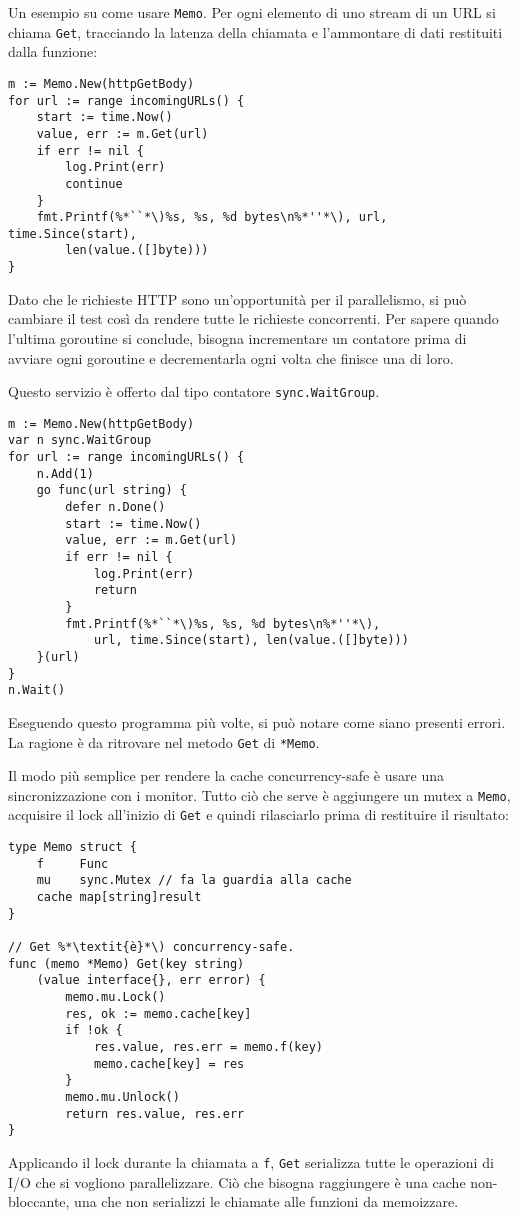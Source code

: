 Un esempio su come usare \verb|Memo|.
Per ogni elemento di uno stream di un URL si chiama \verb|Get|, tracciando la latenza della chiamata e l'ammontare di dati restituiti dalla funzione:
\begin{lstlisting}[frame=single, label={lst:lstlisting9-7.4}]
m := Memo.New(httpGetBody)
for url := range incomingURLs() {
    start := time.Now()
    value, err := m.Get(url)
    if err != nil {
        log.Print(err)
        continue
    }
    fmt.Printf(%*``*\)%s, %s, %d bytes\n%*''*\), url, time.Since(start),
        len(value.([]byte)))
}
\end{lstlisting}
Dato che le richieste HTTP sono un'opportunità per il parallelismo, si può cambiare il test così da rendere tutte le richieste concorrenti.
Per sapere quando l'ultima goroutine si conclude, bisogna incrementare un contatore prima di avviare ogni goroutine e decrementarla ogni volta che finisce una di loro.

Questo servizio è offerto dal tipo contatore \verb|sync.WaitGroup|.
\begin{lstlisting}[frame=single, label={lst:lstlisting9-7.5}]
m := Memo.New(httpGetBody)
var n sync.WaitGroup
for url := range incomingURLs() {
    n.Add(1)
    go func(url string) {
        defer n.Done()
        start := time.Now()
        value, err := m.Get(url)
        if err != nil {
            log.Print(err)
            return
        }
        fmt.Printf(%*``*\)%s, %s, %d bytes\n%*''*\),
            url, time.Since(start), len(value.([]byte)))
    }(url)
}
n.Wait()
\end{lstlisting}
Eseguendo questo programma più volte, si può notare come siano presenti errori.
La ragione è da ritrovare nel metodo \verb|Get| di \verb|*Memo|.

Il modo più semplice per rendere la cache concurrency-safe è usare una sincronizzazione con i monitor.
Tutto ciò che serve è aggiungere un mutex a \verb|Memo|, acquisire il lock all'inizio di \verb|Get| e quindi rilasciarlo prima di restituire il risultato:
\begin{lstlisting}[frame=single, label={lst:lstlisting9-7.6}]
type Memo struct {
    f     Func
    mu    sync.Mutex // fa la guardia alla cache
    cache map[string]result
}

// Get %*\textit{è}*\) concurrency-safe.
func (memo *Memo) Get(key string)
    (value interface{}, err error) {
        memo.mu.Lock()
        res, ok := memo.cache[key]
        if !ok {
            res.value, res.err = memo.f(key)
            memo.cache[key] = res
        }
        memo.mu.Unlock()
        return res.value, res.err
}
\end{lstlisting}
Applicando il lock durante la chiamata a \verb|f|, \verb|Get| serializza tutte le operazioni di I/O che si vogliono parallelizzare.
Ciò che bisogna raggiungere è una cache non-bloccante, una che non serializzi le chiamate alle funzioni da memoizzare.

